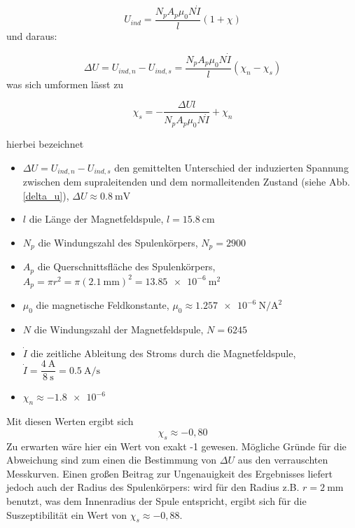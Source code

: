 \[U_{ind}=\dfrac{N_{p}A_{p}\mu_{0}N\dot{I}}{l}(1+\chi)\]
und daraus:

\[\Delta U=U_{ind,n}-U_{ind,s}=\dfrac{N_{p}A_{p}\mu_{0}N\dot{I}}{l}(\chi_{n}-\chi_{s})\]
was sich umformen lässt zu

\[\chi_{s}=-\dfrac{\Delta U l}{N_{p}A_{p}\mu_{0}N\dot{I}}+\chi_{n}\]

hierbei bezeichnet
\begin{itemize}
	\item $\Delta U=U_{ind,n}-U_{ind,s}$ den gemittelten Unterschied der induzierten Spannung zwischen dem supraleitenden und dem normalleitenden Zustand (siehe Abb. \ref{delta_u}), $\Delta U\approx\SI{0,8}{\milli\volt} $
	\item $l$ die Länge der Magnetfeldspule, $l=\SI{15,8}{\centi\meter}$
	\item $N_{p}$ die Windungszahl des Spulenkörpers, $N_{p}=2900$
	\item $A_{p}$ die Querschnittsfläche des Spulenkörpers, $A_{p}=\pi r^2=\pi (\SI{2,1}{\milli\meter})^2=\SI{13,85e-6}{\square\meter}$
	\item $\mu_{0}$ die magnetische Feldkonstante, $\mu_{0}\approx\SI{1,257e-6}{\newton\per\square\ampere}$
	\item $N$ die Windungszahl der Magnetfeldspule, $N=6245$
	\item $\dot{I}$ die zeitliche Ableitung des Stroms durch die Magnetfeldspule, $\dot{I}=\dfrac{\SI{4}{\ampere}}{\SI{8}{\second}}=\SI{0,5}{\ampere\per\second}$
	\item$\chi_{n}\approx\SI{-1,8e-6}{}$
	\end{itemize}

Mit diesen Werten ergibt sich
\[\chi_{s}\approx-0,80\]
Zu erwarten wäre hier ein Wert von exakt -1 gewesen. Mögliche Gründe für die Abweichung sind zum einen die Bestimmung von $\Delta U$ aus den verrauschten Messkurven. Einen großen Beitrag zur Ungenauigkeit des Ergebnisses liefert jedoch auch der Radius des Spulenkörpers: wird für den Radius z.B. $r=\SI{2}{\milli\meter}$ benutzt, was dem Innenradius der Spule entspricht, ergibt sich für die Suszeptibilität ein Wert von $\chi_{s}\approx-0,88$.

